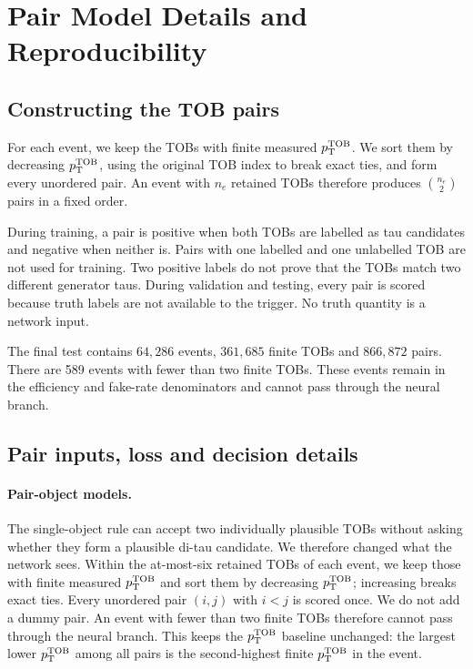 \section{Pair Model Details and Reproducibility}
\label{app:pair_protocol}

\subsection{Constructing the TOB pairs}
For each event, we keep the TOBs with finite measured $p_{\mathrm{T}}^{\mathrm{TOB}}$. We sort them by
decreasing $p_{\mathrm{T}}^{\mathrm{TOB}}$, using the original TOB index to break exact ties, and form
every unordered pair. An event with $n_e$ retained TOBs therefore produces
$\binom{n_e}{2}$ pairs in a fixed order.

During training, a pair is positive when both TOBs are labelled as tau
candidates and negative when neither is. Pairs with one labelled and one
unlabelled TOB are not used for training. Two positive labels do not prove that
the TOBs match two different generator taus. During validation and testing,
every pair is scored because truth labels are not available to the trigger. No
truth quantity is a network input.

The final test contains $64{,}286$ events, $361{,}685$ finite TOBs and
$866{,}872$ pairs. There are 589 events with fewer than two finite TOBs. These
events remain in the efficiency and fake-rate denominators and cannot pass
through the neural branch.

\subsection{Pair inputs, loss and decision details}
\paragraph{Pair-object models.}
The single-object rule can accept two individually plausible TOBs without
asking whether they form a plausible di-tau candidate. We therefore changed
what the network sees. Within the at-most-six retained TOBs of each event, we
keep those with finite measured $p_{\mathrm{T}}^{\mathrm{TOB}}$ and sort them by decreasing $p_{\mathrm{T}}^{\mathrm{TOB}}$;
increasing  breaks exact ties. Every unordered pair $(i,j)$
with $i<j$ is scored once. We do not add a dummy pair. An event with fewer than
two finite TOBs therefore cannot pass through the neural branch. This keeps the
$p_{\mathrm{T}}^{\mathrm{TOB}}$ baseline unchanged: the largest lower $p_{\mathrm{T}}^{\mathrm{TOB}}$ among all pairs is the
second-highest finite $p_{\mathrm{T}}^{\mathrm{TOB}}$ in the event.

